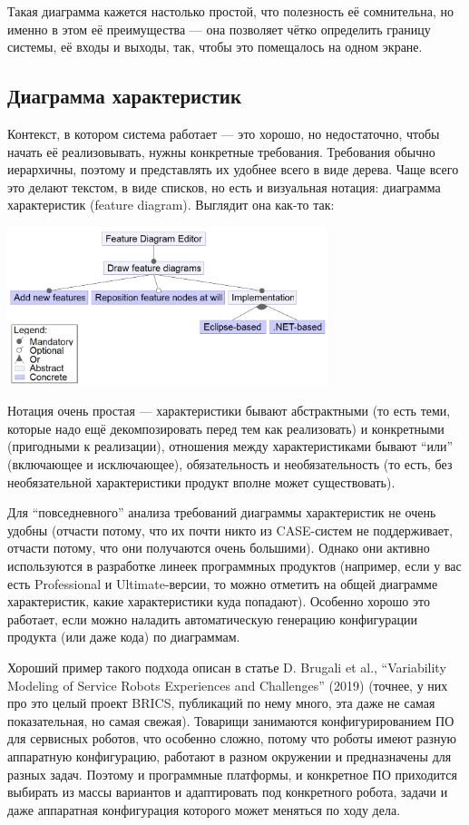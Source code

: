 \documentclass[a5paper]{article}
\begin{document}
Такая диаграмма кажется настолько простой, что полезность её сомнительна, но именно в этом её преимущества --- она позволяет чётко определить границу системы, её входы и выходы, так, чтобы это помещалось на одном экране.

\subsection{Диаграмма характеристик}

Контекст, в котором система работает --- это хорошо, но недостаточно, чтобы начать её реализовывать, нужны конкретные требования. Требования обычно иерархичны, поэтому и представлять их удобнее всего в виде дерева. Чаще всего это делают текстом, в виде списков, но есть и визуальная нотация: диаграмма характеристик (feature diagram). Выглядит она как-то так:

\begin{center}
    \includegraphics[width=0.7\textwidth]{featureDiagram.png}
\end{center}

Нотация очень простая --- характеристики бывают абстрактными (то есть теми, которые надо ещё декомпозировать перед тем как реализовать) и конкретными (пригодными к реализации), отношения между характеристиками бывают ``или'' (включающее и исключающее), обязательность и необязательность (то есть, без необязательной характеристики продукт вполне может существовать).

Для ``повседневного'' анализа требований диаграммы характеристик не очень удобны (отчасти потому, что их почти никто из CASE-систем не поддерживает, отчасти потому, что они получаются очень большими). Однако они активно используются в разработке линеек программных продуктов (например, если у вас есть Professional и Ultimate-версии, то можно отметить на общей диаграмме характеристик, какие характеристики куда попадают). Особенно хорошо это работает, если можно наладить автоматическую генерацию конфигурации продукта (или даже кода) по диаграммам.

Хороший пример такого подхода описан в статье D. Brugali et al., ``Variability Modeling of Service Robots Experiences and Challenges'' (2019) (точнее, у них про это целый проект BRICS, публикаций по нему много, эта даже не самая показательная, но самая свежая). Товарищи занимаются конфигурированием ПО для сервисных роботов, что особенно сложно, потому что роботы имеют разную аппаратную конфигурацию, работают в разном окружении и предназначены для разных задач. Поэтому и программные платформы, и конкретное ПО приходится выбирать из массы вариантов и адаптировать под конкретного робота, задачи и даже аппаратная конфигурация которого может меняться по ходу дела.
\end{document}
